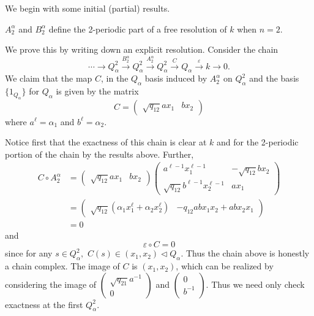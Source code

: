 \documentclass [11pt, proquest] {uwthesis}[2020/02/24]
\begin{document}
    We begin with some initial (partial) results.
    \begin{lem}
        $A_2^\alpha$ and $B_2^\alpha$ define the 2-periodic part of a free resolution of $k$ when $n=2.$
    \end{lem}
    \begin{prf}
        We prove this by writing down an explicit resolution. Consider the chain
        \[\cdots\to Q_\alpha^2\xrightarrow{B_2^\alpha} Q_\alpha^2\xrightarrow{A_2^\alpha} Q_\alpha^2\xrightarrow{C} Q_\alpha \xrightarrow{\varepsilon}k\to 0.\]
        We claim that the map $C$, in the $Q_\alpha$ basis induced by $A_2^\alpha$ on $Q_\alpha^2$ and the basis $\{1_{Q_\alpha}\}$ for $Q_\alpha$ is given by the matrix
        \[C=\begin{pmatrix}
            \sqrt{q_{12}}a x_1 & bx_2
        \end{pmatrix}\]
        where $a^\ell=\alpha_1$ and $b^\ell=\alpha_2$.
        
        Notice first that the exactness of this chain is clear at $k$ and for the 2-periodic portion of the chain by the results above. Further, 
        \begin{align*}
            C\circ A_2^\alpha &= \begin{pmatrix}
            \sqrt{q_{12}}a x_1 & bx_2
        \end{pmatrix}\begin{pmatrix}
            a^{\ell-1}x_1^{\ell -1} & -\sqrt{q_{12}}bx_2\\ 
            \sqrt{q_{12}}b^{\ell-1}x_2^{\ell -1} & ax_1
        \end{pmatrix}\\
        &=\begin{pmatrix}
            \sqrt{q_{12}}(\alpha_1x_1^\ell + \alpha_2x_2^\ell) & -q_{12}abx_1x_2+abx_2x_1
        \end{pmatrix}\\
        &=0
        \end{align*}
        and
        \[\varepsilon\circ C = 0\]
        since for any $s\in Q_\alpha^2,$ $C(s)\in(x_1,x_2)\lhd Q_\alpha$. Thus the chain above is honestly a chain complex. The image of $C$ is $(x_1,x_2)$, which can be realized by considering the image of $(\begin{smallmatrix}
            \sqrt{q_{21}}a^{-1}\\ 0
        \end{smallmatrix})$ and $(\begin{smallmatrix}
            0\\ b^{-1}
        \end{smallmatrix}).$ Thus we need only check exactness at the first $Q_\alpha^2.$
        

\end{prf}
\end{document}
